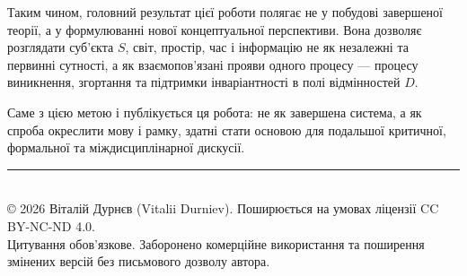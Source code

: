 \documentclass[aps,prd,onecolumn,nofootinbib,superscriptaddress]{revtex4-2} %
\begin{document}
    Таким чином, головний результат цієї роботи полягає не у побудові завершеної теорії, а у формулюванні нової концептуальної перспективи. Вона дозволяє розглядати суб’єкта \(S\), світ, простір, час і інформацію не як незалежні та первинні сутності, а як взаємопов’язані прояви одного процесу — процесу виникнення, згортання та підтримки інваріантності в полі відмінностей \(D\).

    Саме з цією метою і публікується ця робота: не як завершена система, а як спроба окреслити мову і рамку, здатні стати основою для подальшої критичної, формальної та міждисциплінарної дискусії.



    \vfill %
    \begin{center}
        \rule{0.5\textwidth}{.4pt} \\ %
        \vspace{2mm}
        \footnotesize
        © 2026 Віталій Дурнєв (Vitalii Durniev). Поширюється на умовах ліцензії CC BY-NC-ND 4.0. \\
        Цитування обов’язкове. Заборонено комерційне використання та поширення змінених версій без письмового дозволу автора.
    \end{center}
\end{document}
